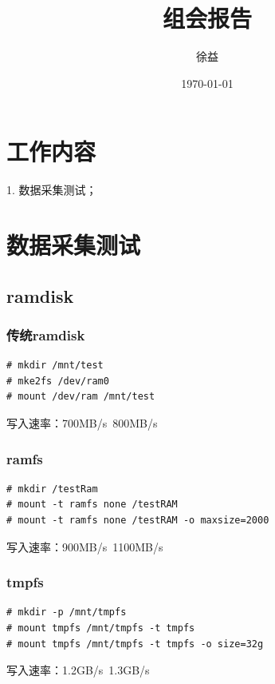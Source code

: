 \documentclass{article}
\title{组会报告}
\author{徐益}
\date{\today}
\begin{document}
\maketitle


\section{工作内容}
1. 数据采集测试；



\section{数据采集测试}
\subsection{ramdisk}
\subsubsection{传统ramdisk}
\begin{lstlisting}
# mkdir /mnt/test
# mke2fs /dev/ram0
# mount /dev/ram /mnt/test
\end{lstlisting}
写入速率：700MB/s~800MB/s
\subsubsection{ramfs}
\begin{lstlisting}
# mkdir /testRam
# mount -t ramfs none /testRAM
# mount -t ramfs none /testRAM -o maxsize=2000
\end{lstlisting}
写入速率：900MB/s~1100MB/s
\subsubsection{tmpfs}
\begin{lstlisting}
# mkdir -p /mnt/tmpfs
# mount tmpfs /mnt/tmpfs -t tmpfs
# mount tmpfs /mnt/tmpfs -t tmpfs -o size=32g
\end{lstlisting}
写入速率：1.2GB/s~1.3GB/s
\end{document}
